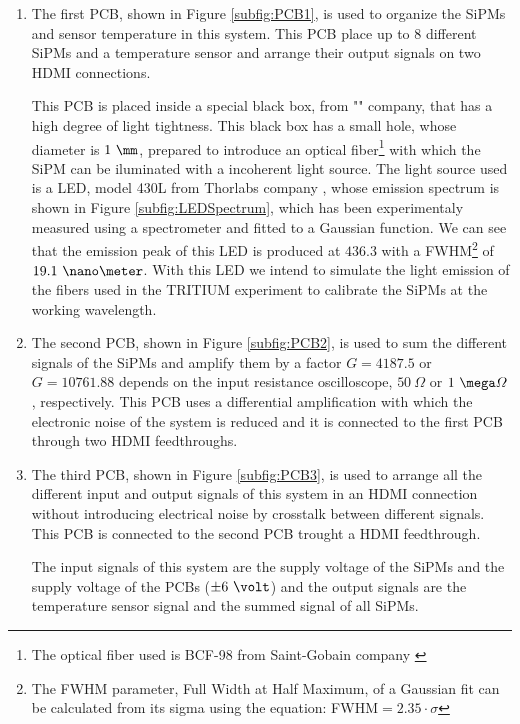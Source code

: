 \begin{enumerate}
\item{} The first PCB, shown in Figure \ref{subfig:PCB1}, is used to organize the SiPMs and sensor temperature in this system. This PCB place up to 8 different SiPMs and a temperature sensor and arrange their output signals on two HDMI connections.

This PCB is placed inside a special black box, from "" company, that has a high degree of light tightness. This black box has a small hole, whose diameter is $1~\mm$, prepared to introduce an optical fiber\footnote{The optical fiber used is BCF-98 from Saint-Gobain company \cite{OpticalFibers}} with which the SiPM can be iluminated with a incoherent light source. The light source used is a LED, model 430L from Thorlabs company \cite{LEDThorlabs}, whose emission spectrum is shown in Figure \ref{subfig:LEDSpectrum}, which has been experimentaly measured using a spectrometer and fitted to a Gaussian function. We can see that the emission peak of this LED is produced at $436.3$ with a FWHM\footnote{The FWHM parameter, Full Width at Half Maximum, of a Gaussian fit can be calculated from its sigma using the equation: FWHM$=2.35 \cdot{} \sigma$} of $19.1~\nano\meter$. With this LED we intend to simulate the light emission of the fibers used in the TRITIUM experiment to calibrate the SiPMs at the working wavelength. 

\item{} The second PCB, shown in Figure \ref{subfig:PCB2}, is used to sum the different signals of the SiPMs and amplify them by a factor $G=4187.5$ or $G=10761.88$ depends on the input resistance oscilloscope, $50~\varOmega$ or $1~\mega\varOmega$, respectively. This PCB uses a differential amplification with which the electronic noise of the system is reduced and it is connected to the first PCB through two HDMI feedthroughs.

\item{} The third PCB, shown in Figure \ref{subfig:PCB3}, is used to arrange all the different input and output signals of this system in an HDMI connection without introducing electrical noise by crosstalk between different signals. This PCB is connected to the second PCB trought a HDMI feedthrough.

The input signals of this system are the supply voltage of the SiPMs and the supply voltage of the PCBs ($\pm 6~\volt$) and the output signals are the temperature sensor signal and the summed signal of all SiPMs. 

\end{enumerate}

